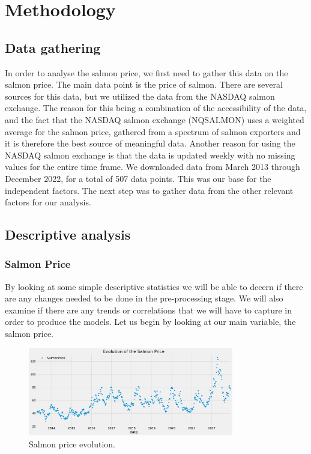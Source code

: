 \section{Methodology}\label{sec:methodology}
\subsection{Data gathering}
In order to analyse the salmon price, we first need to gather this data on the salmon price. The main data point is the price of salmon. There are several sources for this data, but we utilized the data from the NASDAQ salmon exchange. The reason for this being a combination of the accessibility of the data, and the fact that the NASDAQ salmon exchange (NQSALMON) uses a weighted average for the salmon price, gathered from a spectrum of salmon exporters and it is therefore the best source of meaningful data. Another reason for using the NASDAQ salmon exchange is that the data is updated weekly with no missing values for the entire time frame. We downloaded data from March 2013 through December 2022, for a total of 507 data points. This was our base for the independent factors. The next step was to gather data from the other relevant factors for our analysis.

\subsection{Descriptive analysis}
\subsubsection{Salmon Price}\label{Salmon Price}
By looking at some simple descriptive statistics we will be able to decern if there are any changes needed to be done in the pre-processing stage. We will also examine if there are any trends or correlations that we will have to capture in order to produce the models. Let us begin by looking at our main variable, the salmon price.

\begin{figure}[H]
    \centering
    \includegraphics[width=0.8\textwidth]{data/Figures/Descriptive/SalmonPricePlot.png}
    \caption[Evolution of the salmon price]{Salmon price evolution.}\label{fig: Salmon price evolution}
\end{figure}


